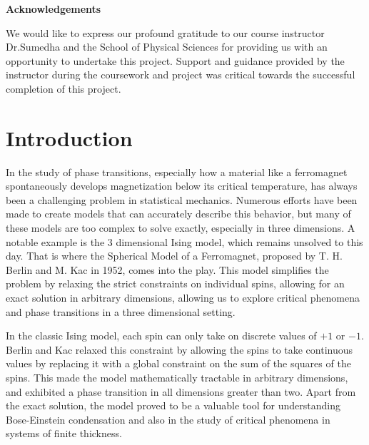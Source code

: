 \documentclass{article}
\begin{document}
\cleardoublepage
\begin{center}
    \Large{\textbf{Acknowledgements}}
\end{center}

\vspace{0.2in}

We would like to express our profound gratitude to our course instructor Dr.Sumedha and the School of Physical Sciences for providing us with an opportunity to undertake this project. Support and guidance provided by the instructor during the coursework and project was critical towards the successful completion of this project.

\newpage
\restoregeometry


\begin{abstract}

\end{abstract}
\restoregeometry



\newpage
\tableofcontents




\newpage
{}
\section{Introduction}

In the study of phase transitions, especially how a material like a ferromagnet spontaneously develops magnetization below its critical temperature, has always been a challenging problem in statistical mechanics. Numerous efforts have been made to create models that can accurately describe this behavior, but many of these models are too complex to solve exactly, especially in three dimensions. A notable example is the 3 dimensional Ising model, which remains unsolved to this day.
That is where the Spherical Model of a Ferromagnet\cite{Foundational}, proposed by T. H. Berlin and M. Kac in 1952, comes into the play. This model simplifies the problem by relaxing the strict constraints on individual spins, allowing for an exact solution in arbitrary dimensions, allowing us to explore critical phenomena and phase transitions in a three dimensional setting.

In the classic Ising model, each spin can only take on discrete values of $+1$ or $-1$. Berlin and Kac relaxed this constraint by allowing the spins to take continuous values by replacing it with a global constraint on the sum of the squares of the spins. This made the model mathematically tractable in arbitrary dimensions, and exhibited a phase transition in all dimensions greater than two. 
Apart from the exact solution, the model proved to be a valuable tool for understanding Bose-Einstein condensation\cite{BECanalogy} and also in the study of critical phenomena in systems of finite thickness\cite{finitethickness}. 
\end{document}
